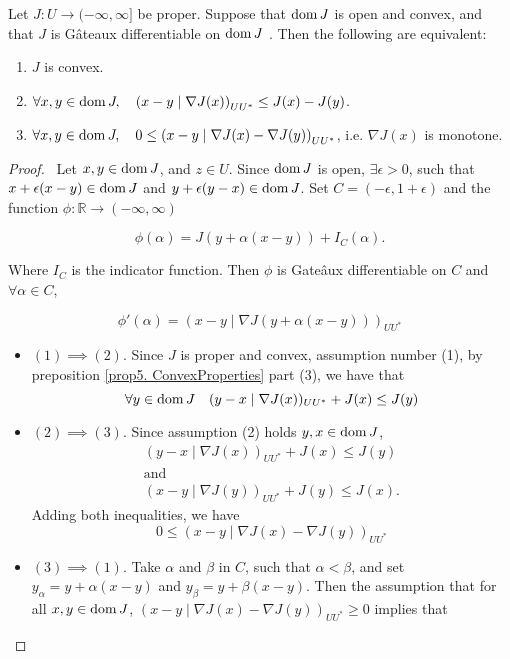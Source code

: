 \begin{proposition}
	 Let $J: U \rightarrow (-\infty, \infty]$ be proper. Suppose that $\mathrm{dom\,} J$
	 is open and convex, and that $J$ is G\^ateaux differentiable on $\mathrm{dom\,} J$ . Then the
	 following are equivalent:
	 \begin{enumerate}
		 \item $J$ is convex.
		 \item $\forall x,y \in \mathrm{dom\,} J, \quad \left(x-y\mid \nabla J(x)\right)_{UU^*}\leq J(x)-J(y)$.
		 \item $\forall x,y \in \mathrm{dom\,} J, \quad 0 \leq \left(x-y\mid \nabla J(x)-\nabla J(y)\right)_{UU^*}$, i.e. $
		 \nabla J(x)$ is monotone.
	 \end{enumerate}
	 \begin{proof}\
  Let $x,y \in \mathrm{dom\,} J$, and $z \in U$. Since $\mathrm{dom\,} J$ is open, $\exists \epsilon >0$, such that $x+\epsilon(x-y) \in \mathrm{dom\,} J$ and $y+\epsilon(y-x) \in \mathrm{dom\,} J$. Set $C=(-\epsilon, 1+\epsilon)$ and the function $\phi: \mathbb{R}\rightarrow(-\infty, \infty)$

		 \[
			 \phi(\alpha) = J(y+\alpha(x-y))+I_C(\alpha).
		 \]
		 
		 Where $I_C$ is the indicator function.  Then $\phi$ is Gate\^aux differentiable on $C$ and $\forall \alpha \in C$,
		 
		 \[
			 \phi'(\alpha)=\left(x-y\mid\nabla J(y+\alpha (x-y))\right)_{UU^*}
		 \]
		 
		\begin{itemize}
		 \item $(1)\implies (2)$. Since $J$ is proper and convex, assumption number (1), by preposition \eqref{prop5. ConvexProperties} part (3), we have that 
		 	 \begin{equation*}
				\forall y \in \mathrm{dom\,} J \quad (y - x \mid \nabla J(x))_{UU^*}+J(x) \leq J(y)
		 	 \end{equation*}
		 \item $(2)\implies(3)$. Since assumption (2) holds $y, x \in \mathrm{dom\,} J$, 
		 \begin{gather*} 
		 (y - x \mid \nabla J(x))_{UU^*}+J(x) \leq J(y) \\
		 		\text{and} \\
		 (x - y \mid \nabla J(y))_{UU^*}+J(y) \leq J(x).
		 \end{gather*}
		 Adding both inequalities, we have
		 \begin{equation*}
		 0 \leq	(x - y \mid \nabla J(x)-\nabla J(y))_{UU^*}
		 \end{equation*}
		 \item $(3)\implies (1)$. Take $\alpha$ and $\beta$ in $C$, such that $\alpha<\beta$, and set $y_\alpha = y +\alpha(x-y)$ and $y_\beta= y +\beta(x-y)$. Then the assumption that for all $x,y \in \mathrm{dom\,} J$, $(x - y \mid \nabla J(x)-\nabla J(y))_{UU^*} \geq 0$ implies that 
		 

\end{itemize}
\end{proof}
\end{proposition}
